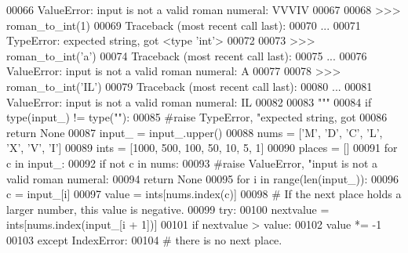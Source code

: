 \begin{DoxyCode}
{00066 \textcolor{stringliteral}{    ValueError: input is not a valid roman numeral: VVVIV}
00067 \textcolor{stringliteral}{}
00068 \textcolor{stringliteral}{    >>> roman\_to\_int(1)}
00069 \textcolor{stringliteral}{    Traceback (most recent call last):}
00070 \textcolor{stringliteral}{     ...}
00071 \textcolor{stringliteral}{    TypeError: expected string, got <type 'int'>}
00072 \textcolor{stringliteral}{}
00073 \textcolor{stringliteral}{    >>> roman\_to\_int('a')}
00074 \textcolor{stringliteral}{    Traceback (most recent call last):}
00075 \textcolor{stringliteral}{     ...}
00076 \textcolor{stringliteral}{    ValueError: input is not a valid roman numeral: A}
00077 \textcolor{stringliteral}{}
00078 \textcolor{stringliteral}{    >>> roman\_to\_int('IL')}
00079 \textcolor{stringliteral}{    Traceback (most recent call last):}
00080 \textcolor{stringliteral}{     ...}
00081 \textcolor{stringliteral}{    ValueError: input is not a valid roman numeral: IL}
00082 \textcolor{stringliteral}{}
00083 \textcolor{stringliteral}{    """}   
00084     \textcolor{keywordflow}{if} type(input\_) != type(\textcolor{stringliteral}{""}):
00085         \textcolor{comment}{#raise TypeError, "expected string, got %
00086         \textcolor{keywordflow}{return} \textcolor{keywordtype}{None}
00087     input\_ = input\_.upper()
00088     nums = [\textcolor{stringliteral}{'M'}, \textcolor{stringliteral}{'D'}, \textcolor{stringliteral}{'C'}, \textcolor{stringliteral}{'L'}, \textcolor{stringliteral}{'X'}, \textcolor{stringliteral}{'V'}, \textcolor{stringliteral}{'I'}]
00089     ints = [1000, 500, 100, 50, 10, 5, 1]
00090     places = []
00091     \textcolor{keywordflow}{for} c \textcolor{keywordflow}{in} input\_:
00092         \textcolor{keywordflow}{if} \textcolor{keywordflow}{not} c \textcolor{keywordflow}{in} nums:
00093             \textcolor{comment}{#raise ValueError, "input is not a valid roman numeral: %
00094             \textcolor{keywordflow}{return} \textcolor{keywordtype}{None}
00095     \textcolor{keywordflow}{for} i \textcolor{keywordflow}{in} range(len(input\_)):
00096         c = input\_[i]
00097         value = ints[nums.index(c)]
00098         \textcolor{comment}{# If the next place holds a larger number, this value is negative.}
00099         \textcolor{keywordflow}{try}:
00100             nextvalue = ints[nums.index(input\_[i + 1])]
00101             \textcolor{keywordflow}{if} nextvalue > value:
00102                 value *= -1
00103         \textcolor{keywordflow}{except} IndexError:
00104             \textcolor{comment}{# there is no next place.}
}}}
\end{DoxyCode}
